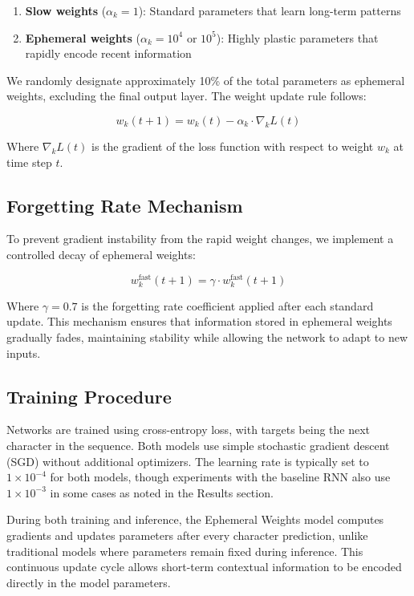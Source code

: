 \documentclass{article} %
\begin{document}
\begin{enumerate}
\item \textbf{Slow weights} ($\alpha_k = 1$): Standard parameters that learn long-term patterns
\item \textbf{Ephemeral weights} ($\alpha_k = 10^4$ or $10^5$): Highly plastic parameters that rapidly encode recent information
\end{enumerate}

We randomly designate approximately 10\% of the total parameters as ephemeral weights, excluding the final output layer. The weight update rule follows:

\begin{equation}
w_k(t+1) = w_k(t) - \alpha_k \cdot \nabla_k L(t)
\end{equation}

Where $\nabla_k L(t)$ is the gradient of the loss function with respect to weight $w_k$ at time step $t$.

\subsection{Forgetting Rate Mechanism}

To prevent gradient instability from the rapid weight changes, we implement a controlled decay of ephemeral weights:

\begin{equation}
w_k^{\text{fast}}(t+1) = \gamma \cdot w_k^{\text{fast}}(t+1)
\end{equation}

Where $\gamma = 0.7$ is the forgetting rate coefficient applied after each standard update. This mechanism ensures that information stored in ephemeral weights gradually fades, maintaining stability while allowing the network to adapt to new inputs.

\subsection{Training Procedure}

Networks are trained using cross-entropy loss, with targets being the next character in the sequence. Both models use simple stochastic gradient descent (SGD) without additional optimizers. The learning rate is typically set to $1 \times 10^{-4}$ for both models, though experiments with the baseline RNN also use $1 \times 10^{-3}$ in some cases as noted in the Results section.

During both training and inference, the Ephemeral Weights model computes gradients and updates parameters after every character prediction, unlike traditional models where parameters remain fixed during inference. This continuous update cycle allows short-term contextual information to be encoded directly in the model parameters.
\end{document}
